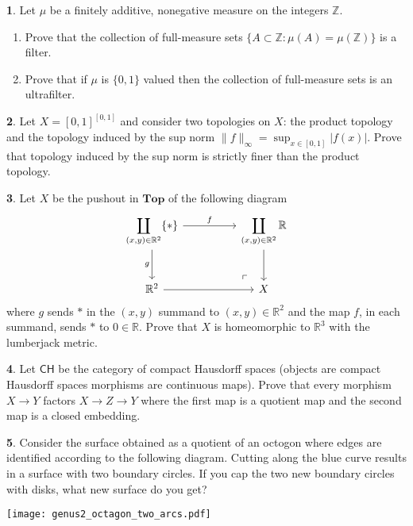 \documentclass[11pt]{article}
\theoremstyle{definition}
\newtheorem{problem}{}
\newcommand{\bp}{\begin{problem}}
\newcommand{\ep}{\end{problem}\bigskip}
\theoremstyle{theorem}
\newcommand{\R}{\mathbb{R}}
\begin{document}
\pagestyle{fancy}
\fancyfoot[R,C,L]{}

\newcommand{\Top}{\mathbf{Top}}
\newcommand{\Set}{\mathbf{Set}}
\newcommand{\N}{\mathbb{N}}

\bp Let $\mu$ be a finitely additive, nonegative measure on the integers $\mathbb{Z}$. 
\begin{enumerate}[label=(\alph*)]
  \item  Prove that the collection of full-measure sets $\{A\subset \mathbb{Z}:\mu(A)=\mu(\mathbb{Z})\}$ is a filter.
\item Prove that if $\mu$ is $\{0,1\}$ valued then the collection of full-measure sets is an ultrafilter.
\end{enumerate}
\ep

\bp Let $X=[0,1]^{[0,1]}$ and consider two topologies on $X$:  the product topology and the topology induced by the sup norm $\|f\|_\infty = \sup_{x\in [0,1]}|f(x)|.$  Prove that topology induced by the sup norm is strictly finer than the product topology.  
\ep

\bp Let $X$ be the  pushout in $\Top$ of the following diagram
\[
\begin{tikzcd}[row sep=large, column sep=huge]
\displaystyle \coprod_{(x,y)\in\R^2} \{\ast \}
  \arrow[r,  "f"] \arrow[d, "g"'] 
& \displaystyle \coprod_{(x,y)\in\R^2} \R
  \arrow[d] \\
\mathbb{R}^2 \arrow[r] 
& X \arrow[ul, phantom, "\ulcorner", very near start] %
\end{tikzcd}
\]
where $g$ sends $\ast$ in the $(x,y)$ summand to $(x,y)\in \R^2$ and the map $f$, in each summand, sends $\ast$ to $0\in \R$.  Prove that $X$ is homeomorphic to $\R^3$ with the lumberjack metric.
\ep

\bp Let $\mathsf{CH}$ be the category of compact Hausdorff spaces (objects are compact Hausdorff spaces morphisms are continuous maps).  Prove that every morphism $X\to Y$ factors $X\to Z\to Y$ where the first map is a quotient map and the second map is a closed embedding.
\ep

\bp Consider the surface obtained as a quotient of an octogon where edges are identified according to the following diagram.  Cutting along the blue curve results in a surface with two boundary circles.  If you cap the two new boundary circles with disks, what new surface do you get?

\begin{center}
\texttt{[image: genus2\_octagon\_two\_arcs.pdf]}
\end{center}
\ep
\end{document}

